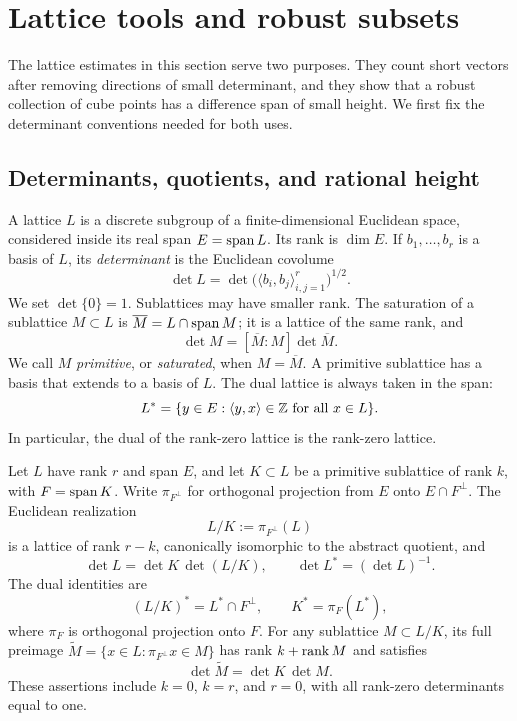 \section{Lattice tools and robust subsets}\label{sec:lattice-tools}

The lattice estimates in this section serve two purposes. They count
short vectors after removing directions of small determinant, and they
show that a robust collection of cube points has a difference span of
small height. We first fix the determinant conventions needed for both
uses.

\subsection{Determinants, quotients, and rational height}

A lattice \(L\) is a discrete subgroup of a finite-dimensional
Euclidean space, considered inside its real span \(E=\operatorname{span} L\).
Its rank is \(\dim E\). If \(b_1,\ldots,b_r\) is a basis of \(L\), its
\emph{determinant} is the Euclidean covolume
\[
 \det L=\det\bigl(\langle b_i,b_j\rangle_{i,j=1}^r\bigr)^{1/2}.
\]
We set \(\det\{0\}=1\). Sublattices may have smaller rank. The
saturation of a sublattice \(M\subset L\) is
\(\overline M=L\cap\operatorname{span} M\); it is a lattice of the same rank, and
\[
 \det M=[\overline M:M]\det\overline M.
\]
We call \(M\) \emph{primitive}, or \emph{saturated}, when
\(M=\overline M\). A primitive sublattice has a basis that extends to
a basis of \(L\). The dual lattice is always taken in the span:
\[
 L^*=\{y\in E:\langle y,x\rangle\in\mathbb Z\text{ for all }x\in L\}.
\]
In particular, the dual of the rank-zero lattice is the rank-zero
lattice.

\begin{lemma}\label{lem:lattice-quotient}
Let \(L\) have rank \(r\) and span \(E\), and let \(K\subset L\) be a
primitive sublattice of rank \(k\), with \(F=\operatorname{span} K\). Write
\(\pi_{F^\perp}\) for orthogonal projection from \(E\) onto
\(E\cap F^\perp\). The Euclidean realization
\[
 L/K:=\pi_{F^\perp}(L)
\]
is a lattice of rank \(r-k\), canonically isomorphic to the abstract
quotient, and
\[
 \det L=\det K\,\det(L/K),\qquad
 \det L^*=(\det L)^{-1}.
\]
The dual identities are
\[
 (L/K)^*=L^*\cap F^\perp,\qquad
 K^*=\pi_F(L^*),
\]
where \(\pi_F\) is orthogonal projection onto \(F\).
For any sublattice \(M\subset L/K\), its full preimage
\(\widetilde M=\{x\in L:\pi_{F^\perp}x\in M\}\) has rank
\(k+\operatorname{rank} M\) and satisfies
\[
 \det\widetilde M=\det K\,\det M.
\]
These assertions include \(k=0\), \(k=r\), and \(r=0\), with all
rank-zero determinants equal to one.
\end{lemma}

